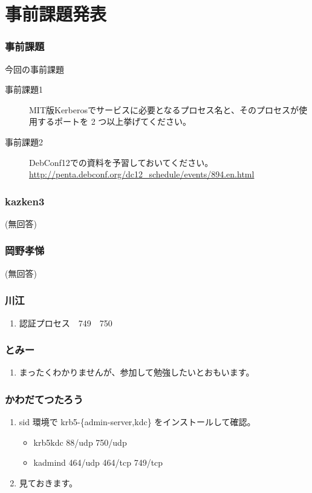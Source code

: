 \documentclass[cjk,dvipdfmx,10pt,%
hyperref={bookmarks=true,bookmarksnumbered=true,bookmarksopen=false,%
colorlinks=false,%
pdftitle={第 63 回 関西 Debian 勉強会},%
pdfauthor={倉敷・のがた・かわだ・佐々木},%
pdfsubject={資料},%
}]{beamer}
\begin{document}
\section{事前課題発表}


\begin{frame}[fragile]
\frametitle{事前課題}

\begin{block}{今回の事前課題}
  \begin{description}
  \item[事前課題1] MIT版Kerberosでサービスに必要となるプロセス名と、そのプロセスが使用するポートを 2 つ以上挙げてください。

  \item[事前課題2] DebConf12での資料を予習しておいてください。\\
   \url{http://penta.debconf.org/dc12_schedule/events/894.en.html}
  \end{description}
\end{block}

\end{frame}


\begin{frame}
  \frametitle{ kazken3 }
  (無回答)
\end{frame}

\begin{frame}
  \frametitle{ 岡野孝悌 }
  (無回答)
\end{frame}

\begin{frame}
  \frametitle{ 川江 }
  \begin{enumerate}
  \item 認証プロセス　749　750
  \end{enumerate}
\end{frame}

\begin{frame}
  \frametitle{ とみー }
  \begin{enumerate}
  \item まったくわかりませんが、参加して勉強したいとおもいます。
  \end{enumerate}
\end{frame}

\begin{frame}
  \frametitle{ かわだてつたろう }
  \begin{enumerate}
  \item sid 環境で krb5-\{admin-server,kdc\} をインストールして確認。
    \begin{itemize}
    \item krb5kdc 88/udp 750/udp
    \item kadmind 464/udp 464/tcp 749/tcp
    \end{itemize}
  \item 見ておきます。
  \end{enumerate}
\end{frame}
\end{document}
